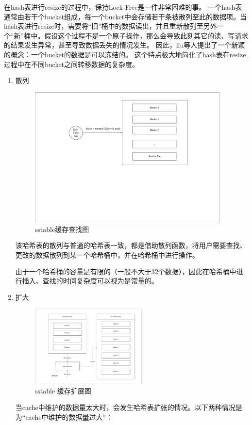 \begin{enumerate}
			在hash表进行resize的过程中，保持Lock-Free是一件非常困难的事。
一个hash表通常由若干个bucket组成，每一个bucket中会存储若干条被散列至此的数据项。当hash表进行resize时，需要将“旧”桶中的数据读出，并且重新散列至另外一个“新”桶中。假设这个过程不是一个原子操作，那么会导致此刻其它的读、写请求的结果发生异常，甚至导致数据丢失的情况发生。
因此，liu等人提出了一个新颖的概念：一个bucket的数据是可以冻结的。
这个特点极大地简化了hash表在resize过程中在不同bucket之间转移数据的复杂度。

			\begin{enumerate}
				\item 散列 
				
				\begin{figure}[H]
					\centering
					\includegraphics[width=0.95\textwidth]{pdf/cache_select.pdf}
					\caption{sstable缓存查找图}
					\label{sstable_cache_select}
				\end{figure}
				该哈希表的散列与普通的哈希表一致，都是借助散列函数，将用户需要查找、更改的数据散列到某一个哈希桶中，并在哈希桶中进行操作。

由于一个哈希桶的容量是有限的（一般不大于32个数据），因此在哈希桶中进行插入、查找的时间复杂度可以视为是常量的。

				
				\item 扩大
				
				\begin{figure}[H]
					\centering
					\includegraphics[width=0.55\textwidth]{pdf/cache_expend.pdf}
					\caption{sstable 缓存扩展图}
					\label{sstable_cache_expand}
				\end{figure}
				当cache中维护的数据量太大时，会发生哈希表扩张的情况。以下两种情况是为“cache中维护的数据量过大”：


\end{enumerate}
\end{enumerate}
